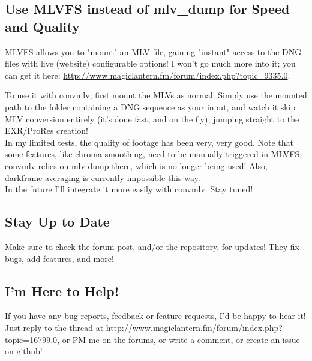 \documentclass[a4paper,12pt]{article}
\begin{document}
	\subsection{Use MLVFS instead of mlv\_dump for Speed and Quality}
		MLVFS allows you to "mount" an MLV file, gaining "instant" access to the DNG files with live (website) configurable options! I won't go
		much more into it; you can get it here: \url{http://www.magiclantern.fm/forum/index.php?topic=9335.0}.
		
		To use it with convmlv, first mount the MLVs as normal. Simply use the mounted path to the folder containing a DNG sequence as your input,
		and watch it skip MLV conversion entirely (it's done fast, and on the fly), jumping straight to the EXR/ProRes creation!\\
		
		In my limited tests, the quality of footage has been very, very good. Note that some features, like chroma smoothing, need to be manually
		triggered in MLVFS; convmlv relies on mlv-dump there, which is no longer being used! Also, darkframe averaging is currently impossible this way.\\
		
		In the future I'll integrate it more easily with convmlv. Stay tuned!

	\subsection{Stay Up to Date}
		Make sure to check the forum post, and/or the repository, for updates! They fix bugs, add features, and more!

	\subsection{I'm Here to Help!}
	
		If you have any bug reports, feedback or feature requests, I'd be happy to hear it! Just reply to the thread at 
		\url{http://www.magiclantern.fm/forum/index.php?topic=16799.0}, or PM me on the forums, or write a comment, or create an issue on github!
\end{document}
